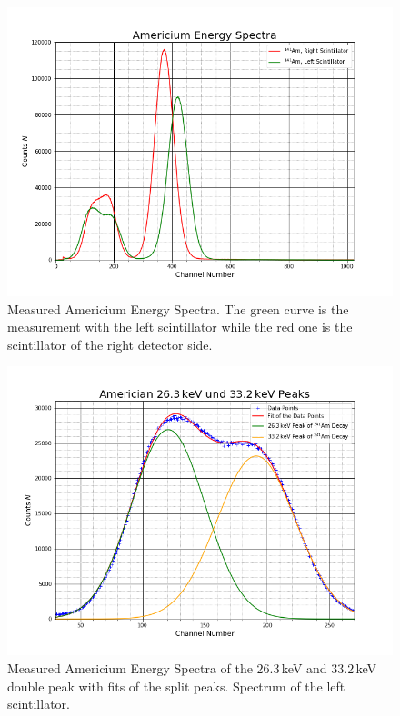 \documentclass[30pt,a4paper]{article}
\begin{document}
 	\begin{figure}[h]
 		\includegraphics[scale=0.5]{Bilder/Americium_Energy_Spectra}
 		\centering
 		\caption[Americium Spectra]{Measured Americium Energy Spectra. The green curve is the measurement with the left scintillator while the red one is the scintillator of the right detector side.}
 		\label{AS}
 	\end{figure}
 	\begin{figure}[h]
 		\includegraphics[scale=0.5]{Bilder/kleine_Peaks2}
 		\centering
 		\caption[Americium Spectra Double Peak Left Detector Side]{Measured Americium Energy Spectra of the $26.3$\,keV and $33.2$\,keV double peak with fits of the split peaks. Spectrum of the left scintillator.}
 		\label{ASL}
 	\end{figure}
\end{document}
